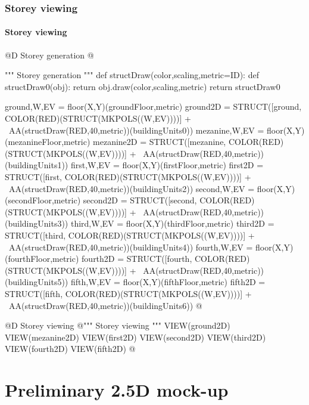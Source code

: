 \documentclass[11pt,oneside]{article}    %
\begin{document}
\subsubsection{Storey viewing}

\paragraph{Storey viewing}
@D Storey generation
@{""" Storey generation """
def structDraw(color,scaling,metric=ID):
    def structDraw0(obj): return obj.draw(color,scaling,metric)
    return structDraw0

ground,W,EV = floor(X,Y)(groundFloor,metric)
ground2D = STRUCT([ground, COLOR(RED)(STRUCT(MKPOLS((W,EV))))] + \
            AA(structDraw(RED,40,metric))(buildingUnits0))
mezanine,W,EV = floor(X,Y)(mezanineFloor,metric)
mezanine2D = STRUCT([mezanine, COLOR(RED)(STRUCT(MKPOLS((W,EV))))] + \
            AA(structDraw(RED,40,metric))(buildingUnits1))
first,W,EV = floor(X,Y)(firstFloor,metric)
first2D = STRUCT([first, COLOR(RED)(STRUCT(MKPOLS((W,EV))))] + \
            AA(structDraw(RED,40,metric))(buildingUnits2))
second,W,EV = floor(X,Y)(secondFloor,metric)
second2D = STRUCT([second, COLOR(RED)(STRUCT(MKPOLS((W,EV))))] + \
            AA(structDraw(RED,40,metric))(buildingUnits3))
third,W,EV = floor(X,Y)(thirdFloor,metric)
third2D = STRUCT([third, COLOR(RED)(STRUCT(MKPOLS((W,EV))))] + \
            AA(structDraw(RED,40,metric))(buildingUnits4))
fourth,W,EV = floor(X,Y)(fourthFloor,metric)
fourth2D = STRUCT([fourth, COLOR(RED)(STRUCT(MKPOLS((W,EV))))] + \
            AA(structDraw(RED,40,metric))(buildingUnits5))
fifth,W,EV = floor(X,Y)(fifthFloor,metric)
fifth2D = STRUCT([fifth, COLOR(RED)(STRUCT(MKPOLS((W,EV))))] + \
            AA(structDraw(RED,40,metric))(buildingUnits6))
@}

@D Storey viewing
@{""" Storey viewing """
VIEW(ground2D)
VIEW(mezanine2D)
VIEW(first2D)
VIEW(second2D)
VIEW(third2D)
VIEW(fourth2D)
VIEW(fifth2D)
@}


\section{Preliminary 2.5D mock-up}
\end{document}
